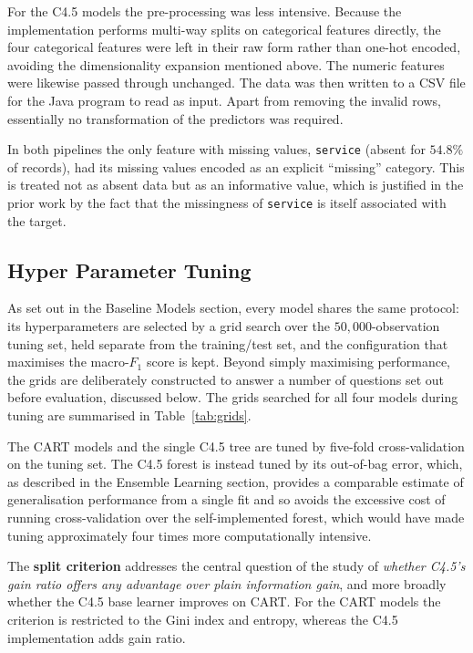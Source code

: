 \documentclass[conference]{IEEEtran}
\begin{document}
For the C4.5 models the pre-processing was less intensive. Because the implementation performs
multi-way splits on categorical features directly, the four categorical features were left in
their raw form rather than one-hot encoded, avoiding the dimensionality expansion mentioned above.
The numeric features were likewise passed through unchanged. The data was then written
to a CSV file for the Java program to read as input. Apart from removing the invalid rows, essentially no
transformation of the predictors was required.

In both pipelines the only feature with missing values, \texttt{service} (absent for $54.8\%$
of records), had its missing values encoded as an explicit ``missing'' category. This is treated
not as absent data but as an informative value, which is justified in the prior work by the fact
that the missingness of \texttt{service} is itself associated with the target.

\subsection{Hyper Parameter Tuning} %

As set out in the Baseline Models section, every model shares the same protocol: its
hyperparameters are selected by a grid search over the $50{,}000$-observation tuning set, held
separate from the training/test set, and the configuration that maximises the macro-$F_1$ score
is kept. Beyond simply maximising performance, the grids are deliberately constructed to
answer a number of questions set out before evaluation, discussed below. The grids searched for
all four models during tuning are summarised in Table~\ref{tab:grids}.

The CART models and the single C4.5 tree are tuned by five-fold cross-validation on the tuning
set. The C4.5 forest is instead tuned by its out-of-bag error, which, as described in the
Ensemble Learning section, provides a comparable estimate of generalisation performance from a
single fit and so avoids the excessive cost of running cross-validation over the
self-implemented forest, which would have made tuning approximately four times more computationally
intensive.

The \textbf{split criterion} addresses the central question of the study of \emph{whether C4.5's gain
ratio offers any advantage over plain information gain}, and more broadly whether the C4.5 base
learner improves on CART. For the CART models the criterion is restricted to the Gini index and
entropy, whereas the C4.5 implementation adds gain ratio.
\end{document}

